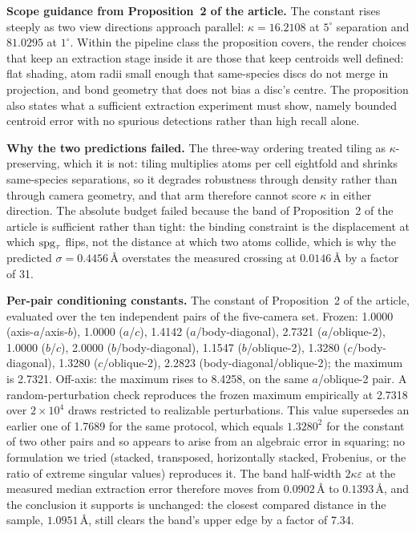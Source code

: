 \textbf{Scope guidance from Proposition~2 of the article.} The constant rises steeply as two view directions
approach parallel: $\kappa = 16.2108$ at $5^\circ$ separation and $81.0295$ at $1^\circ$. Within the pipeline
class the proposition covers, the render choices that keep an extraction stage inside it are those that keep
centroids well defined: flat shading, atom radii small enough that same-species discs do not merge in
projection, and bond geometry that does not bias a disc's centre. The proposition also states what a
sufficient extraction experiment must show, namely bounded centroid error with no spurious detections rather
than high recall alone.

\textbf{Why the two predictions failed.} The three-way ordering treated tiling as $\kappa$-preserving, which
it is not: tiling multiplies atoms per cell eightfold and shrinks same-species separations, so it degrades
robustness through density rather than through camera geometry, and that arm therefore cannot score $\kappa$
in either direction. The absolute budget failed because the band of Proposition~2 of the article is
sufficient rather than tight: the binding constraint is the displacement at which $\mathrm{spg}_\tau$ flips, not the
distance at which two atoms collide, which is why the predicted $\sigma = 0.4456$\,\AA{} overstates the
measured crossing at $0.0146$\,\AA{} by a factor of 31.

\textbf{Per-pair conditioning constants.} The constant of Proposition~2 of the article, evaluated over the ten
independent pairs of the five-camera set. Frozen: 1.0000 (axis-$a$/axis-$b$), 1.0000 ($a$/$c$), 1.4142
($a$/body-diagonal), 2.7321 ($a$/oblique-2), 1.0000 ($b$/$c$), 2.0000 ($b$/body-diagonal), 1.1547
($b$/oblique-2), 1.3280 ($c$/body-diagonal), 1.3280 ($c$/oblique-2), 2.2823 (body-diagonal/oblique-2); the
maximum is 2.7321. Off-axis: the maximum rises to 8.4258, on the same $a$/oblique-2 pair. A random-perturbation
check reproduces the frozen maximum empirically at 2.7318 over $2\times10^{4}$ draws restricted to realizable
perturbations. This value supersedes an earlier one of 1.7689 for the same protocol, which equals $1.3280^2$
for the constant of two other pairs and so appears to arise from an algebraic error in squaring; no
formulation we tried (stacked, transposed, horizontally stacked, Frobenius, or the ratio of extreme singular
values) reproduces it. The band half-width $2\kappa\varepsilon$ at the measured median extraction error
therefore moves from $0.0902$\,\AA{} to $0.1393$\,\AA{}, and the conclusion it supports is unchanged: the
closest compared distance in the sample, $1.0951$\,\AA{}, still clears the band's upper edge by a factor of
7.34.

